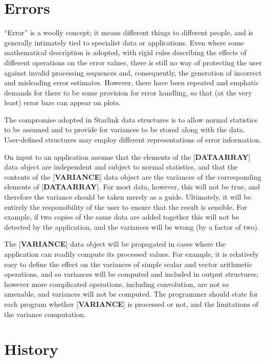 \documentclass[twoside,11pt]{article}
\newcommand{\xlabel}[1]{}
\renewcommand{\_}{\texttt{\symbol{95}}}
\begin{document}
\section{\xlabel{se_errors}Errors\label{se:errors}}

``Error'' is a woolly concept;  it means different things to different
people, and is generally intimately tied to specialist data or
applications.  Even where some mathematical description is adopted,
with rigid rules describing the effects of different operations
on the error values, there is still no way of protecting the
user against invalid processing sequences and,
consequently, the generation of
incorrect and misleading error estimates.
However, there have been repeated and emphatic demands for there
to be some provision for error handling,
so that (at the very least) error bars can appear on plots.

The compromise adopted
in Starlink data structures is to allow
normal statistics to be assumed and to provide for
variances to be stored along with the data.  User-defined
structures may employ different representations of error
information.

On input to an application assume that the elements of the
{[}{\bf DATA\_ARRAY}{]} data object are independent and subject to
normal statistics, and that the contents of the {[}{\bf VARIANCE}{]}
data object are the variances of the corresponding elements of
{[}{\bf DATA\_ARRAY}{]}.
For most data, however, this will not be true, and therefore
the variance should be taken merely as a guide.  Ultimately, it will be
entirely the responsibility of the user to ensure that the result is
sensible.  For example, if two copies of the same data are added
together this will not be detected by the application, and
the variances will be wrong (by a factor of two).

The {[}{\bf VARIANCE}{]} data object will
be propagated in cases where the application can
readily compute its processed values.  For example, it is relatively
easy to define the effect on the variances of
simple scalar and vector arithmetic operations, and so
variances will be computed and included
in output structures;  however more complicated operations,
including convolution, are not so amenable, and variances
will not be computed.  The programmer
should state for each program whether {[}{\bf VARIANCE}{]} is
processed or not, and the limitations of the variance computation.

\section{History}
\end{document}
